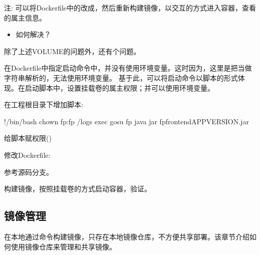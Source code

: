 \documentclass[letterpaper,10pt,english]{sphinxmanual}
\begin{document}
注: 可以将Dockerfile中的改成，然后重新构建镜像，以交互的方式进入容器，查看的属主信息。
\begin{itemize}
\item {} 
如何解决？

\end{itemize}

除了上述VOLUME的问题外，还有个问题。

在Dockerfile中指定启动命令中，并没有使用环境变量。这时因为，这里是把当做字符串解析的，无法使用环境变量。
基于此，可以将启动命令以脚本的形式体现。在启动脚本中，设置挂载卷的属主权限；并可以使用环境变量。

在工程根目录下增加脚本:

\begin{sphinxVerbatim}[commandchars=\\\{\}]
\PYGZsh{}!/bin/bash
chown fp:fp /logs
exec gosu fp java \PYGZhy{}jar fp\PYGZhy{}frontend\PYGZhy{}\PYGZdl{}APP\PYGZus{}VERSION.jar
\end{sphinxVerbatim}

给脚本赋权限()

修改Dockerfile:

\begin{sphinxVerbatim}[commandchars=\\\{\}]
  

 \PYG{p}{[}\PYG{p}{]}
\end{sphinxVerbatim}

参考源码分支。

构建镜像，按照挂载卷的方式启动容器，验证。


\subsection{镜像管理}
\label{\detokenize{docker/practice:id10}}
在本地通过命令构建镜像，只存在本地镜像仓库，不方便共享部署。该章节介绍如何使用镜像仓库来管理和共享镜像。
\end{document}
